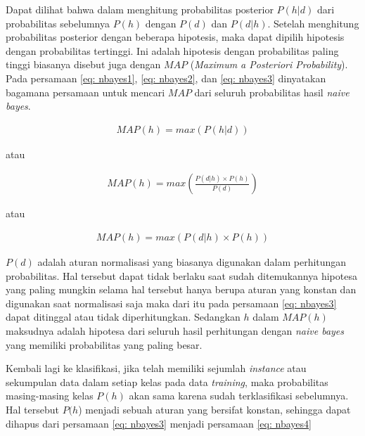 \begin{subs}
	Dapat dilihat bahwa dalam menghitung probabilitas posterior $P(h|d)$ dari probabilitas sebelumnya $P(h)$ dengan $P(d)$ dan $P(d|h)$. Setelah menghitung probabilitas posterior dengan beberapa hipotesis, maka dapat dipilih hipotesis dengan probabilitas tertinggi. Ini adalah hipotesis dengan probabilitas paling tinggi biasanya disebut juga dengan $MAP$ (\textit{Maximum a Posteriori Probability}). Pada persamaan \ref{eq: nbayes1}, \ref{eq: nbayes2}, dan \ref{eq: nbayes3} dinyatakan bagamana persamaan untuk mencari $MAP$ dari seluruh probabilitas hasil \textit{naive bayes}.
	\vspace{1ex}
	
	\begin{equation}\label{eq: nbayes1}
	\begin{split}
	MAP(h) = max(P(h|d))
	\end{split}
	\end{equation}
	
	\noindent atau
	
	\begin{equation}\label{eq: nbayes2}
	\begin{split}
	MAP(h) = max\left(\frac{P(d|h) \times P(h)}{P(d)} \right)
	\end{split}
	\end{equation}
	
	\noindent atau
	
	\begin{equation}\label{eq: nbayes3}
	\begin{split}
	MAP(h) = max(P(d|h) \times P(h))
	\end{split}
	\end{equation}
	
	$P(d)$ adalah aturan normalisasi yang biasanya digunakan dalam perhitungan probabilitas. Hal tersebut dapat tidak berlaku saat sudah ditemukannya hipotesa yang paling mungkin selama hal tersebut hanya berupa aturan yang konstan dan digunakan saat normalisasi saja maka dari itu pada persamaan \ref{eq: nbayes3} dapat ditinggal atau tidak diperhitungkan. Sedangkan $h$ dalam $MAP(h)$ maksudnya adalah hipotesa dari seluruh hasil perhitungan dengan \textit{naive bayes} yang memiliki probabilitas yang paling besar.
	\vspace{1ex}
	
	Kembali lagi ke klasifikasi, jika telah memiliki sejumlah \textit{instance} atau sekumpulan data dalam setiap kelas pada data \textit{training}, maka probabilitas masing-masing kelas $P(h)$ akan sama karena sudah terklasifikasi sebelumnya. Hal tersebut $P(h$) menjadi sebuah aturan yang bersifat konstan, sehingga dapat dihapus dari persamaan \ref{eq: nbayes3} menjadi persamaan \ref{eq: nbayes4}
	

\end{subs}
